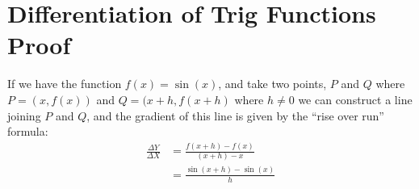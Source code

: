 \chapter{Differentiation of Trig Functions Proof}
\label{sec:DiffTrigProof}
If we have the function $f(x) = \sin(x)$, and take two points, $P$ and $Q$ where
$P = (x,f(x))$ and $Q = (x+h, f(x+h)$ where $h \neq 0$ we can construct a line
joining $P$ and $Q$, and the gradient of this line is given by the ``rise
over run'' formula:
\begin{align}
  \frac{\Delta Y}{\Delta X} & = \frac{f(x+h) - f(x)}{(x+h) - x} \\
                            & = \frac{\sin(x+h) - \sin(x)}{h}
\end{align}